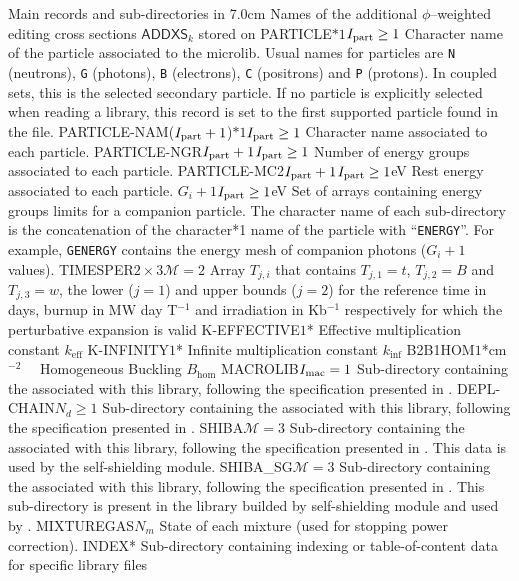 \begin{DescriptionEnregistrement}{Main records and sub-directories in }{7.0cm}
  {Names of the additional $\phi$--weighted editing cross sections $\mathsf{ADDXS}_{k}$ stored on }
\OptCharEnr
  {PARTICLE}{$*1$}{$I_{\rm part}\ge 1$} 
  {Character name of the particle associated to the microlib. Usual names for
  particles are {\tt N} (neutrons), {\tt G} (photons), {\tt B} (electrons),
  {\tt C} (positrons) and {\tt P} (protons). In coupled sets, this is the
  selected secondary particle. If no particle is explicitly selected when
  reading a  library, this record is set to the first supported
  particle found in the file.}
\OptCharEnr
  {PARTICLE-NAM}{($I_{\rm part}+1$)$*1$}{$I_{\rm part}\ge 1$} 
  {Character name associated to each particle.}
\OptIntEnr
  {PARTICLE-NGR}{$I_{\rm part}+1$}{$I_{\rm part}\ge 1$}
  {Number of energy groups associated to each particle.}
\OptRealEnr
  {PARTICLE-MC2}{$I_{\rm part}+1$}{$I_{\rm part}\ge 1$}{eV}
  {Rest energy associated to each particle.}
\OptRealVar
  {}{$G_i+1$}{$I_{\rm part}\ge 1$}{eV}
  {Set of arrays containing energy groups limits for a companion particle. The character name
  of each sub-directory is the concatenation of the character*1 name of the particle with ``{\tt ENERGY}''.
  For example, {\tt GENERGY} contains the energy mesh of companion photons ($G_i+1$ values).}
\OptRealEnr
  {TIMESPER}{$2\times 3$}{$\mathcal{M}=2$}{}
  {Array $T_{j,i}$ that contains $T_{j,1}=t$, $T_{j,2}=B$ and $T_{j,3}=w$, the
   lower ($j=1$) and upper bounds ($j=2$) for the reference time in days, burnup
   in MW day T$^{-1}$ and irradiation in Kb$^{-1}$ respectively for which the
   perturbative expansion is valid}
\OptRealEnr
  {K-EFFECTIVE}{$1$}{*}{}
  {Effective multiplication constant $k_{\mathrm{eff}}$}
\OptRealEnr
  {K-INFINITY}{$1$}{*}{}
  {Infinite multiplication constant $k_{\mathrm{inf}}$}
\OptRealEnr
  {B2B1HOM}{$1$}{*}{cm$^{-2}$~~}
  {Homogeneous Buckling $B_{\mathrm{hom}}$}
\OptDirEnr
  {MACROLIB}{$I_{\rm mac} = 1$}
  {Sub-directory containing the  associated with this
  library, following the specification presented in .}
\OptDirEnr
  {DEPL-CHAIN}{$N_{d} \ge 1$}
  {Sub-directory containing the  associated with this library, following
  the specification presented in .}
\OptDirEnr
  {SHIBA}{$\mathcal{M}=3$}
  {Sub-directory containing the  associated with this
  library, following the specification presented in .
  This data is used by the  self-shielding module.}
\OptDirEnr
  {SHIBA\_SG}{$\mathcal{M}=3$}
  {Sub-directory containing the  associated with this
  library, following the specification presented in .
  This sub-directory is present in the library builded by  self-shielding module and used by .}
\IntEnr
  {MIXTUREGAS}{$N_{m}$}
  {State of each mixture (used for stopping power correction).}
\OptDirEnr
  {INDEX}{*}
  {Sub-directory containing indexing or table-of-content data for specific library
  files}
\end{DescriptionEnregistrement}


